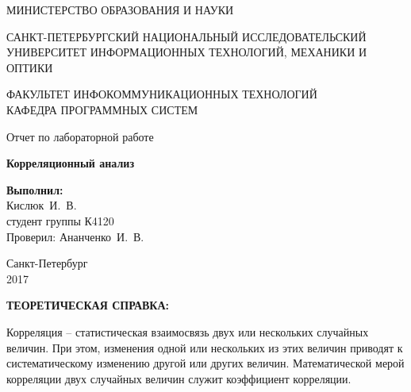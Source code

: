 \documentclass[14pt,a4paper]{extreport}
\newcommand{\header}[1]{%
{
\clearpage%
\fontsize{16pt}{14pt}\selectfont
\begin{center}
\textbf{\MakeUppercase{#1}:}
\end{center}
}
}
\newcommand{\labyear}{2017}
\newcommand{\labtitle}{Корреляционный анализ}
\newcommand{\prepod}{Ананченко~И.~В.}
\newcommand{\student}{Кислюк~И.~В.}
\begin{document}
	\begin{titlepage}
	\begin{center}	
		\fontsize{14pt}{14pt}\selectfont
		МИНИСТЕРСТВО ОБРАЗОВАНИЯ И НАУКИ\\

		\vspace*{0.6\baselineskip}

		\MakeUppercase{Санкт-Петербургский Национальный Исследовательский Университет Информационных технологий, механики и оптики}		
		
		\vspace*{0.6\baselineskip}
		\MakeUppercase{Факультет Инфокоммуникационных технологий}\\
		\MakeUppercase{Кафедра программных систем}
	
		\vspace*{7\baselineskip}
		\fontsize{19pt}{18pt}\selectfont
		Отчет по лабораторной работе
		
		\fontsize{20pt}{18pt}\selectfont
		\textbf{\labtitle}\\
		\vspace*{1.15\baselineskip}
		\end{center}
	
	\vspace*{2\baselineskip}
	\begin{flushright}
	\fontsize{14pt}{14pt}\selectfont
	\textbf{Выполнил:}\\
	\student\\
	студент группы К4120\\
	Проверил: \prepod\\
	\end{flushright}
	
	\vspace{\fill}
	\begin{center}
	Санкт-Петербург\\
	\vspace{-1ex}
	\labyear
	\end{center}
	
\end{titlepage}

\fontsize{14pt}{14pt}\selectfont

\header{Теоретическая справка}

Корреляция -- статистическая взаимосвязь двух или нескольких случайных величин. При этом, изменения одной или нескольких из этих величин приводят к систематическому изменению другой или других величин. Математической мерой корреляции двух случайных величин служит коэффициент корреляции. 
\end{document}
